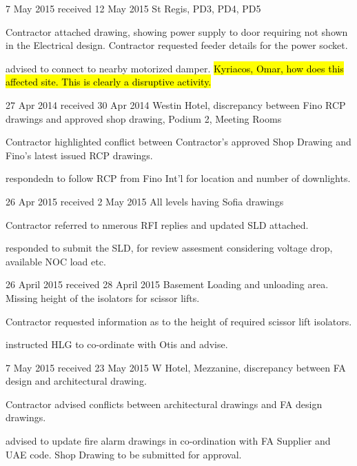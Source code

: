  {7 May 2015 received 12 May 2015 } {St Regis, PD3, PD4, PD5}
  {
    \item Contractor attached drawing, showing power supply to door requiring not shown in the Electrical design. Contractor requested feeder details for the power socket.
    \item \KA advised to connect to nearby motorized damper.
    \hl{Kyriacos, Omar, how does this affected site. This is clearly a disruptive activity.}
  }

 {27 Apr 2014 received 30 Apr 2014} {Westin Hotel, discrepancy between Fino RCP drawings and approved shop drawing, Podium 2, Meeting Rooms}
 {
    \item Contractor highlighted conflict between Contractor's approved Shop Drawing and Fino's latest issued RCP drawings. 
    \item \KA respondedn to follow RCP from Fino Int'l for location and number of downlights.
 }

 {26 Apr 2015 received 2 May 2015 } {All levels having Sofia drawings}
  {
    \item  Contractor referred to nmerous RFI replies   and updated SLD attached.
    \item \KA responded to submit the SLD, for review assesment considering voltage drop, available NOC load etc. 
  }

 {26 April 2015 received 28 April 2015 }{ Basement Loading and unloading area. Missing height of the isolators for scissor lifts.}
 {
   \item Contractor requested information as to the height of required scissor lift isolators.
   \item \KA instructed HLG to co-ordinate with Otis and advise.
 }

 {7 May 2015 received 23 May 2015} {W Hotel, Mezzanine, discrepancy between FA design and architectural drawing.}
 {
 	\item Contractor advised conflicts between architectural drawings and FA design drawings.
 	\item \KA advised to update fire alarm drawings in co-ordination with FA Supplier and UAE code. Shop Drawing to be submitted for approval.
 }
 
